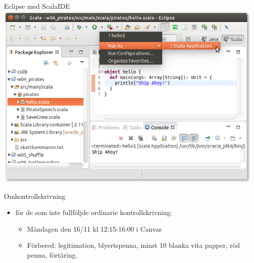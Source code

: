 \begin{Slide}{Eclipse med ScalaIDE}
\includegraphics[width=\textwidth]{../img/eclipse/eclipse-pirates-hello.png}
\end{Slide}

\ifkompendium\else
\begin{Slide}{Omkontrollskrivning}
  \begin{itemize}
    \item {} för de som inte fullföljde ordinarie kontrollskrivning:
    \begin{itemize}
      \item Måndagen den 16/11 kl 12:15-16:00 i Canvas
      \item Förbered: legitimation, blyertspenna, minst 10 blanka vita papper, röd penna, förtäring.
    \end{itemize}
  \end{itemize}
\end{Slide}
\fi 
